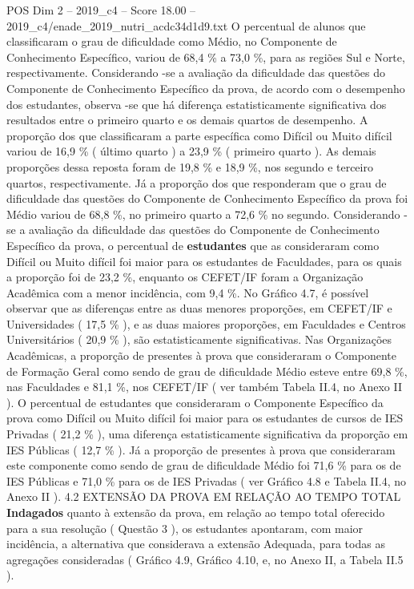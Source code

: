 \begin{textsample}{POS Dim 2 – 2019\_c4 – Score 18.00 – 2019\_c4/enade\_2019\_nutri\_acdc34d1d9.txt}
O percentual de alunos que classificaram o grau de dificuldade como Médio, no Componente de Conhecimento Específico, variou de 68,4 \% a 73,0 \%, para as regiões Sul e Norte, respectivamente.
Considerando -se a avaliação da dificuldade das questões do Componente de Conhecimento Específico da prova, de acordo com o desempenho dos estudantes, observa -se que há diferença estatisticamente significativa dos resultados entre o primeiro quarto e os demais quartos de desempenho.
A proporção dos que classificaram a parte específica como Difícil ou Muito difícil variou de 16,9 \% ( último quarto ) a 23,9 \% ( primeiro quarto ).
As demais proporções dessa reposta foram de 19,8 \% e 18,9 \%, nos segundo e terceiro quartos, respectivamente.
Já a proporção dos que responderam que o grau de dificuldade das questões do Componente de Conhecimento Específico da prova foi Médio variou de 68,8 \%, no primeiro quarto a 72,6 \% no segundo.
Considerando -se a avaliação da dificuldade das questões do Componente de Conhecimento Específico da prova, o percentual de \textbf{estudantes} que as consideraram como Difícil ou Muito difícil foi maior para os estudantes de Faculdades, para os quais a proporção foi de 23,2 \%, enquanto os CEFET/IF foram a Organização Acadêmica com a menor incidência, com 9,4 \%.
No Gráfico 4.7, é possível observar que as diferenças entre as duas menores proporções, em CEFET/IF e Universidades ( 17,5 \% ), e as duas maiores proporções, em Faculdades e Centros Universitários ( 20,9 \% ), são estatisticamente significativas.
Nas Organizações Acadêmicas, a proporção de presentes à prova que consideraram o Componente de Formação Geral como sendo de grau de dificuldade Médio esteve entre 69,8 \%, nas Faculdades e 81,1 \%, nos CEFET/IF ( ver também Tabela II.4, no Anexo II ).
O percentual de estudantes que consideraram o Componente Específico da prova como Difícil ou Muito difícil foi maior para os estudantes de cursos de IES Privadas ( 21,2 \% ), uma diferença estatisticamente significativa da proporção em IES Públicas ( 12,7 \% ).
Já a proporção de presentes à prova que consideraram este componente como sendo de grau de dificuldade Médio foi 71,6 \% para os de IES Públicas e 71,0 \% para os de IES Privadas ( ver Gráfico 4.8 e Tabela II.4, no Anexo II ). 4.2 EXTENSÃO DA PROVA EM RELAÇÃO AO TEMPO TOTAL \textbf{Indagados} quanto à extensão da prova, em relação ao tempo total oferecido para a sua resolução ( Questão 3 ), os estudantes apontaram, com maior incidência, a alternativa que considerava a extensão Adequada, para todas as agregações consideradas ( Gráfico 4.9, Gráfico 4.10, e, no Anexo II, a Tabela II.5 ).

\end{textsample}
